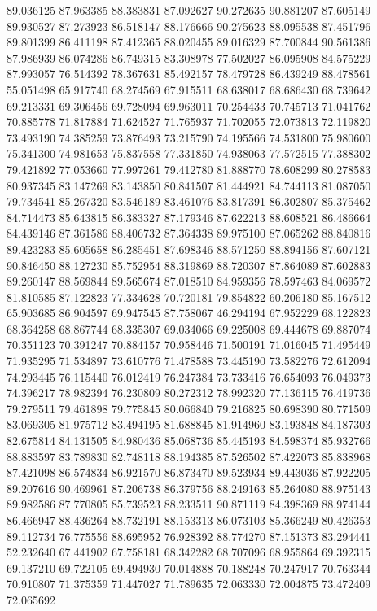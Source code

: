 89.036125
87.963385
88.383831
87.092627
90.272635
90.881207
87.605149
89.930527
87.273923
86.518147
88.176666
90.275623
88.095538
87.451796
89.801399
86.411198
87.412365
88.020455
89.016329
87.700844
90.561386
87.986939
86.074286
86.749315
83.308978
77.502027
86.095908
84.575229
87.993057
76.514392
78.367631
85.492157
78.479728
86.439249
88.478561
55.051498
65.917740
68.274569
67.915511
68.638017
68.686430
68.739642
69.213331
69.306456
69.728094
69.963011
70.254433
70.745713
71.041762
70.885778
71.817884
71.624527
71.765937
71.702055
72.073813
72.119820
73.493190
74.385259
73.876493
73.215790
74.195566
74.531800
75.980600
75.341300
74.981653
75.837558
77.331850
74.938063
77.572515
77.388302
79.421892
77.053660
77.997261
79.412780
81.888770
78.608299
80.278583
80.937345
83.147269
83.143850
80.841507
81.444921
84.744113
81.087050
79.734541
85.267320
83.546189
83.461076
83.817391
86.302807
85.375462
84.714473
85.643815
86.383327
87.179346
87.622213
88.608521
86.486664
84.439146
87.361586
88.406732
87.364338
89.975100
87.065262
88.840816
89.423283
85.605658
86.285451
87.698346
88.571250
88.894156
87.607121
90.846450
88.127230
85.752954
88.319869
88.720307
87.864089
87.602883
89.260147
88.569844
89.565674
87.018510
84.959356
78.597463
84.069572
81.810585
87.122823
77.334628
70.720181
79.854822
60.206180
85.167512
65.903685
86.904597
69.947545
87.758067
46.294194
67.952229
68.122823
68.364258
68.867744
68.335307
69.034066
69.225008
69.444678
69.887074
70.351123
70.391247
70.884157
70.958446
71.500191
71.016045
71.495449
71.935295
71.534897
73.610776
71.478588
73.445190
73.582276
72.612094
74.293445
76.115440
76.012419
76.247384
73.733416
76.654093
76.049373
74.396217
78.982394
76.230809
80.272312
78.992320
77.136115
76.419736
79.279511
79.461898
79.775845
80.066840
79.216825
80.698390
80.771509
83.069305
81.975712
83.494195
81.688845
81.914960
83.193848
84.187303
82.675814
84.131505
84.980436
85.068736
85.445193
84.598374
85.932766
88.883597
83.789830
82.748118
88.194385
87.526502
87.422073
85.838968
87.421098
86.574834
86.921570
86.873470
89.523934
89.443036
87.922205
89.207616
90.469961
87.206738
86.379756
88.249163
85.264080
88.975143
89.982586
87.770805
85.739523
88.233511
90.871119
84.398369
88.974144
86.466947
88.436264
88.732191
88.153313
86.073103
85.366249
80.426353
89.112734
76.775556
88.695952
76.928392
88.774270
87.151373
83.294441
52.232640
67.441902
67.758181
68.342282
68.707096
68.955864
69.392315
69.137210
69.722105
69.494930
70.014888
70.188248
70.247917
70.763344
70.910807
71.375359
71.447027
71.789635
72.063330
72.004875
73.472409
72.065692
